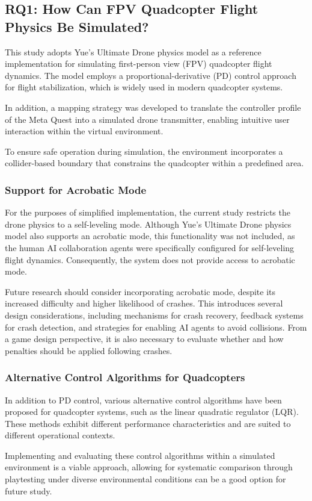 \subsection{RQ1: How Can FPV Quadcopter Flight Physics Be Simulated?}

This study adopts Yue's Ultimate Drone physics model \parencite{yuetility2022fpvphysics} as a reference implementation for simulating first-person view (FPV) quadcopter flight dynamics. The model employs a proportional-derivative (PD) control approach for flight stabilization, which is widely used in modern quadcopter systems. 

In addition, a mapping strategy was developed to translate the controller profile of the Meta Quest into a simulated drone transmitter, enabling intuitive user interaction within the virtual environment.

To ensure safe operation during simulation, the environment incorporates a collider-based boundary that constrains the quadcopter within a predefined area.

\subsubsection{Support for Acrobatic Mode}

For the purposes of simplified implementation, the current study restricts the drone physics to a self-leveling mode. Although Yue's Ultimate Drone physics model also supports an acrobatic mode, this functionality was not included, as the human AI collaboration agents were specifically configured for self-leveling flight dynamics. Consequently, the system does not provide access to acrobatic mode.

Future research should consider incorporating acrobatic mode, despite its increased difficulty and higher likelihood of crashes. This introduces several design considerations, including mechanisms for crash recovery, feedback systems for crash detection, and strategies for enabling AI agents to avoid collisions. From a game design perspective, it is also necessary to evaluate whether and how penalties should be applied following crashes.

\subsubsection{Alternative Control Algorithms for Quadcopters}

In addition to PD control, various alternative control algorithms have been proposed for quadcopter systems, such as the linear quadratic regulator (LQR). These methods exhibit different performance characteristics and are suited to different operational contexts.

Implementing and evaluating these control algorithms within a simulated environment is a viable approach, allowing for systematic comparison through playtesting under diverse environmental conditions can be a good option for future study.